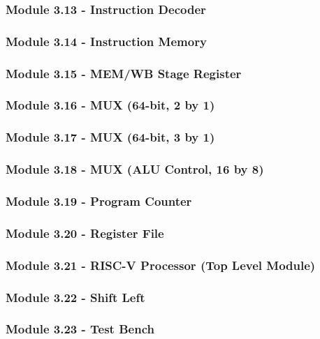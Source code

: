 \documentclass[12pt]{article}
\begin{document}
\subsubsection*{\large Module 3.13 - Instruction Decoder}

\subsubsection*{\large Module 3.14 - Instruction Memory}

\subsubsection*{\large Module 3.15 - MEM/WB Stage Register}

\subsubsection*{\large Module 3.16 - MUX (64-bit, 2 by 1)}

\subsubsection*{\large Module 3.17 - MUX (64-bit, 3 by 1)}

\subsubsection*{\large Module 3.18 - MUX (ALU Control, 16 by 8)}

\subsubsection*{\large Module 3.19 - Program Counter}

\subsubsection*{\large Module 3.20 - Register File}

\subsubsection*{\large Module 3.21 - RISC-V Processor (Top Level Module)}

\subsubsection*{\large Module 3.22 - Shift Left}

\subsubsection*{\large Module 3.23 - Test Bench}

\end{document}
